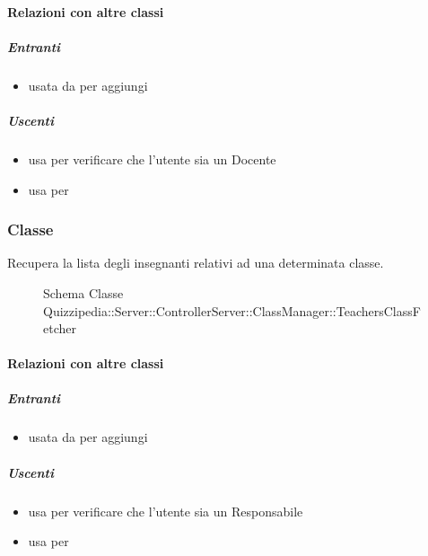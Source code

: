 \paragraph{Relazioni con altre classi}
\subparagraph{Entranti}
\begin{itemize}
\item usata da  per aggiungi
\end{itemize}
\subparagraph{Uscenti}
\begin{itemize}
\item usa  per verificare che l'utente sia un Docente
\item usa  per 
\end{itemize}
\subsubsection{Classe }
Recupera la lista degli insegnanti relativi ad una determinata classe.
\begin{figure}[H]
\centering
\noindent{}
\caption[Schema Classe TeachersClassFetcher]{Schema Classe Quizzipedia::Server::ControllerServer::ClassManager::TeachersClassFetcher}
\end{figure}
\paragraph{Relazioni con altre classi}
\subparagraph{Entranti}
\begin{itemize}
\item usata da  per aggiungi
\end{itemize}
\subparagraph{Uscenti}
\begin{itemize}
\item usa  per verificare che l'utente sia un Responsabile
\item usa  per 
\end{itemize}
